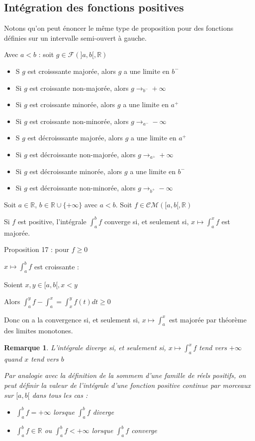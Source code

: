 \documentclass[a4paper,12pt]{book}
\newcommand{\Thr}[2]{\begin{tcolorbox}[sharp corners, colback=white,colframe=red!90!black!75, title=Théorème : #1]#2\end{tcolorbox}}
\newcommand{\Prop}[2]{\begin{tcolorbox}[sharp corners, colback=white,colframe=red!90!black!75, title=Proposition : #1]#2\end{tcolorbox}}
\newcommand{\Pre}[1]{\begin{tcolorbox}[sharp corners, colback=white,colframe=green!60!green!30!black!75, title=Preuve]#1\end{tcolorbox}}
\newtheorem{Rem}{Remarque}[section]
\def\R{\mathbb{R}}
\begin{document}
\subsection{Intégration des fonctions positives}
Notons qu'on peut énoncer le même type de proposition pour des fonctions définies sur un intervalle semi-ouvert à gauche.
\Thr{Rappel sur les limites monotones}{Avec $a<b$ : soit $g\in\mathcal{F}(]a,b[,\R)$ \begin{itemize}
\item S $g$ est croisssante majorée, alors $g$ a une limite en $b^-$
\item Si $g$ est croissante non-majorée, alors $g\to_{b^-}+\infty$
\item Si $g$ est croissante minorée, alors $g$ a une limite en $a^+$
\item Si $g$ est croissante non-minorée, alors $g\to_{a^-}-\infty$
\item S $g$ est décroisssante majorée, alors $g$ a une limite en $a^+$
\item Si $g$ est décroissante non-majorée, alors $g\to_{a^+}+\infty$
\item Si $g$ est décroissante minorée, alors $g$ a une limite en $b^-$
\item Si $g$ est décroissante non-minorée, alors $g\to_{b^+}-\infty$
\end{itemize}}
\Prop{}{Soit $a\in \R$, $b\in\R\cup\{+\infty\}$ avec $a<b$. Soit $f\in\mathcal{CM}([a,b[, \R)$ \par Si $f$ est positive, l'intégrale $\int_a^bf$ converge si, et seulement si, $x\mapsto\int_a^xf$ est majorée.}
\Pre{Proposition 17 : pour $f\geq 0$ \par $x\mapsto \int_a^bf$ est croissante : \par Soient $x,y\in[a,b[, x<y$ \par Alors $\int_a^yf -\int_a^x = \int_x^yf(t)dt\geq 0$ \par Donc on a la convergence si, et seulement si, $x\mapsto \int_a^x$ est majorée par théorème des limites monotones.}
\begin{Rem}
L'intégrale diverge si, et seulement si, $x\mapsto \int_a^xf$ tend vers $+\infty$ quand $x$ tend vers $b$
\par Par analogie avec la définition de la sommem d'une famille de réels positifs, on peut définir la valeur de l'intégrale d'une fonction positive continue par morceaux sur $[a,b[$ dans tous les cas :\begin{itemize}
\item $\int_a^bf=+\infty$ lorsque $\int_a^bf$ diverge
\item $\int_a^bf\in \R$ ou $\int_a^bf<+\infty$ lorsque $\int_a^bf$ converge
\end{itemize}
\end{Rem}
\end{document}
